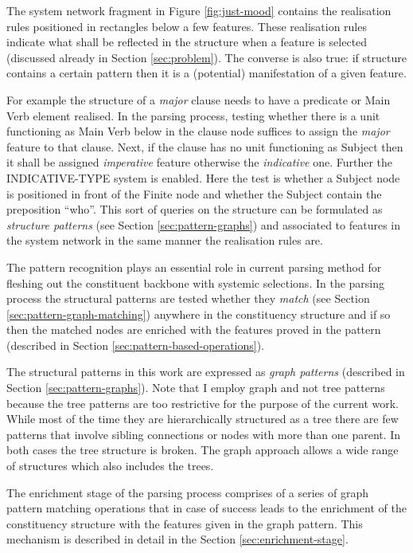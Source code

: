 The system network fragment in Figure \ref{fig:just-mood} contains the realisation rules positioned in rectangles below a few features. These realisation rules indicate what shall be reflected in the structure when a feature is selected (discussed already in Section \ref{sec:problem}). The converse is also true: if structure contains a certain pattern then it is a (potential) manifestation of a given feature.

For example the structure of a \textit{major} clause needs to have a predicate or Main Verb element realised. In the parsing process, testing whether there is a unit functioning as Main Verb below in the clause node suffices to assign the \textit{major} feature to that clause. Next, if the clause has no unit functioning as Subject then it shall be assigned \textit{imperative} feature otherwise the \textit{indicative} one. Further the INDICATIVE-TYPE system is enabled. Here the test is whether a Subject node is positioned in front of the Finite node and whether the Subject contain the preposition ``who''. This sort of queries on the structure can be formulated as \textit{structure patterns} (see Section \ref{sec:pattern-graphs}) and associated to features in the system network in the same manner the realisation rules are. 

The pattern recognition plays an essential role in current parsing method for fleshing out the constituent backbone with systemic selections. In the parsing process the structural patterns are tested whether they \textit{match} (see Section \ref{sec:pattern-graph-matching}) anywhere in the constituency structure and if so then the matched nodes are enriched with the features proved in the pattern (described in Section \ref{sec:pattern-based-operations}). 

The structural patterns in this work are expressed as \textit{graph patterns} (described in Section \ref{sec:pattern-graphs}). Note that I employ graph and not tree patterns because the tree patterns are too restrictive for the purpose of the current work. While most of the time they are hierarchically structured as a tree there are few patterns that involve sibling connections or nodes with more than one parent. In both cases the tree structure is broken. The graph approach allows a wide range of structures which also includes the trees. 

The enrichment stage of the parsing process comprises of a series of graph pattern matching operations that in case of success leads to the enrichment of the constituency structure with the features given in the graph pattern. This mechanism is described in detail in the Section \ref{sec:enrichment-stage}. 

